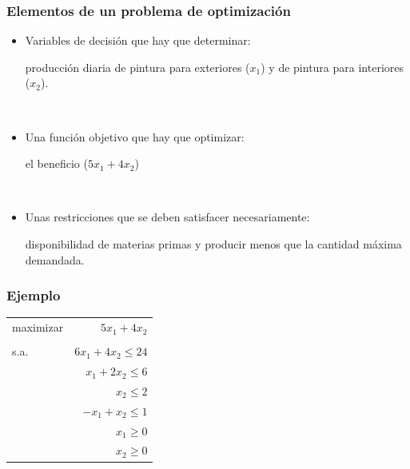 \documentclass{beamer}
\begin{document}
\begin{frame}
\frametitle{Elementos de un problema de optimización}


\begin{itemize}
\item Variables de decisión que hay que determinar: 

producción diaria de pintura para exteriores ($x_1$) y de pintura para interiores ($x_2$).



\

\item Una función objetivo que hay que optimizar: 

el beneficio ($5x_1 + 4x_2$)

\

\item Unas restricciones que se deben satisfacer necesariamente: 

disponibilidad de materias primas y producir menos que la cantidad máxima demandada.
\end{itemize}


\end{frame}
\begin{frame}
\frametitle{Ejemplo}

\begin{center}
\begin{tabular}{lr}
maximizar & $5x_1 + 4x_2$ \\
	 &  \\
s.a. & $6x_1+4x_2 \leq 24$    \\
	 & $x_1 + 2x_2\leq 6$  \\
	 & $x_2\leq 2$ \\
	 & $-x_1 + x_2\leq 1$ \\
	 & $x_1\geq 0$\\
	 & $x_2\geq 0$
\end{tabular}
\end{center}



\end{frame}
\end{document}
